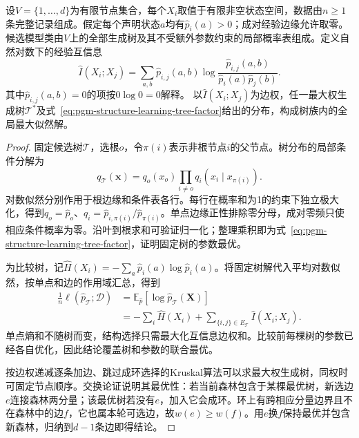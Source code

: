 \begin{theorem}
  \label{thm:pgm-structure-learning-chow-liu}
  设$V=\{1,\ldots,d\}$为有限节点集合，每个$X_i$取值于有限非空状态空间，数据由$n\geq1$条完整记录组成。假定每个声明状态$a$均有$\widehat p_i(a)>0$；成对经验边缘允许取零。候选模型类由$V$上的全部生成树及其不受额外参数约束的局部概率表组成。定义自然对数下的经验互信息
  \[
    \widehat I(X_i;X_j)
    =\sum_{a,b}\widehat p_{i,j}(a,b)
       \log\frac{\widehat p_{i,j}(a,b)}
                     {\widehat p_i(a)\widehat p_j(b)}.
  \]
  其中$\widehat p_{i,j}(a,b)=0$的项按$0\log 0=0$解释。
  以$\widehat I(X_i;X_j)$为边权，任一最大权生成树$\mathcal{T}^{*}$及式~\eqref{eq:pgm-structure-learning-tree-factor}给出的分布，构成树族内的全局最大似然解。
\end{theorem}

\begin{proof}
  固定候选树$\mathcal{T}$，选根$o$，令$\pi(i)$表示非根节点$i$的父节点。树分布的局部条件分解为
  \[
    q_{\mathcal{T}}(\bm{x})
    =q_o(x_o)\prod_{i\ne o}q_i(x_i\mid x_{\pi(i)}).
  \]
  对数似然分别作用于根边缘和条件表各行。每行在概率和为1的约束下独立极大化，得到$q_o=\widehat p_o$、$q_i=\widehat p_{i,\pi(i)}/\widehat p_{\pi(i)}$。单点边缘正性排除零分母，成对零频只使相应条件概率为零。沿叶到根求和可验证归一化；整理乘积即为式~\eqref{eq:pgm-structure-learning-tree-factor}，证明固定树的参数最优。

  为比较树，记$\widehat H(X_i)=-\sum_a\widehat p_i(a)\log\widehat p_i(a)$。将固定树解代入平均对数似然，按单点和边的作用域汇总，得到
  \begin{equation}
    \begin{aligned}
      \frac1n\ell(\widehat p_{\mathcal{T}};\mathcal{D})
      &=\mathbb{E}_{\widehat p}
          [\log\widehat p_{\mathcal{T}}(\bm{X})]\\
      &=-\sum_i\widehat H(X_i)
        +\sum_{\{i,j\}\in E_{\mathcal{T}}}
           \widehat I(X_i;X_j).
    \end{aligned}
    \label{eq:pgm-structure-learning-tree-score}
  \end{equation}
  单点熵和不随树而变，结构选择只需最大化互信息边权和。比较前每棵树的参数已经各自优化，因此结论覆盖树和参数的联合最优。

  按边权递减逐条加边、跳过成环选择的Kruskal算法可以求最大权生成树，同权时可固定节点顺序。交换论证说明其最优性：若当前森林包含于某棵最优树，新选边$e$连接森林两分量；该最优树若没有$e$，加入它会成环。环上有跨相应分量边界且不在森林中的边$f$，它也属本轮可选边，故$w(e)\geq w(f)$。用$e$换$f$保持最优并包含新森林，归纳到$d-1$条边即得结论。
\end{proof}

